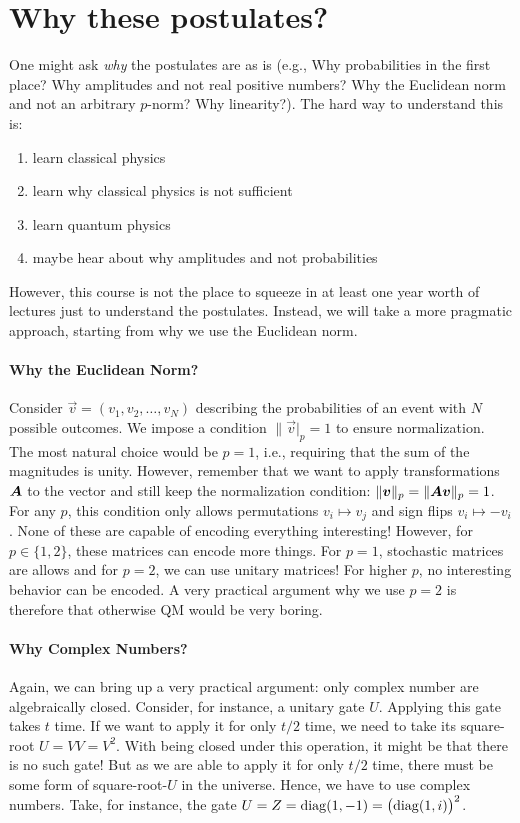 	\section{Why these postulates?}
		One might ask \emph{why} the postulates are as is (e.g., Why probabilities in the first place? Why amplitudes and not real positive numbers? Why the Euclidean norm and not an arbitrary \(p\)-norm? Why linearity?). The hard way to understand this is:
		\begin{enumerate}
			\item learn classical physics
			\item learn why classical physics is not sufficient
			\item learn quantum physics
			\item maybe hear about why amplitudes and not probabilities
		\end{enumerate}
		However, this course is not the place to squeeze in at least one year worth of lectures just to understand the postulates. Instead, we will take a more pragmatic approach, starting from why we use the Euclidean norm.

		\paragraph{Why the Euclidean Norm?}
			Consider \( \vec{v} = (v_1, v_2, \dots, v_N) \) describing the probabilities of an event with \(N\) possible outcomes. We impose a condition \( \lVert \vec{v} \rvert_p = 1 \) to ensure normalization. The most natural choice would be \( p = 1 \), i.e., requiring that the sum of the magnitudes is unity. However, remember that we want to apply transformations \(\bm{A}\) to the vector and still keep the normalization condition: \( \lVert \bm{v} \rVert_p = \lVert \bm{A} \bm{v} \rVert_p = 1 \). For any \(p\), this condition only allows permutations \( v_i \mapsto v_j \) and sign flips \( v_i \mapsto -v_i \). None of these are capable of encoding everything interesting! However, for \( p \in \{ 1, 2 \} \), these matrices can encode more things. For \( p = 1 \), stochastic matrices are allows and for \( p = 2 \), we can use unitary matrices! For higher \(p\), no interesting behavior can be encoded. A very practical argument why we use \(p = 2\) is therefore that otherwise \ac{QM} would be very boring.

		\paragraph{Why Complex Numbers?}
			Again, we can bring up a very practical argument: only complex number are algebraically closed. Consider, for instance, a unitary gate \(U\). Applying this gate takes \(t\) time. If we want to apply it for only \(t/2\) time, we need to take its square-root \( U = VV = V^2 \). With being closed under this operation, it might be that there is no such gate! But as we are able to apply it for only \(t/2\) time, there must be some form of square-root-\(U\) in the universe. Hence, we have to use complex numbers. Take, for instance, the gate \( U = Z = \operatorname{diag}(1, -1) = \bigl(\operatorname{diag}(1, i)\bigr)^2 \).

